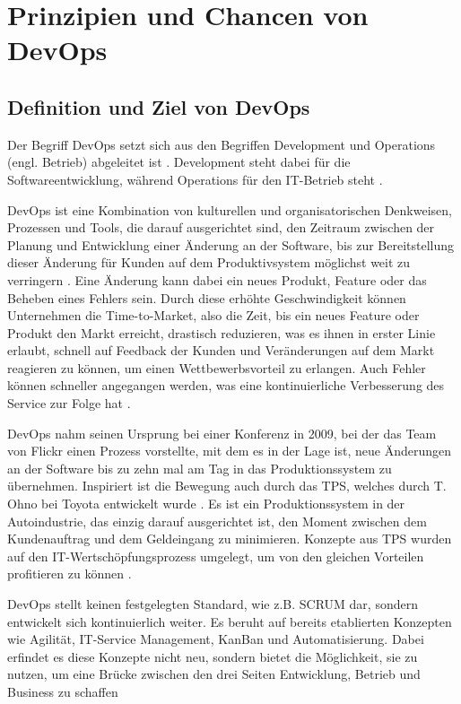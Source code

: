 \newpage
\section{Prinzipien und Chancen von DevOps}

\subsection{Definition und Ziel von DevOps}

Der Begriff DevOps setzt sich aus den Begriffen Development und 
Operations (engl. Betrieb) abgeleitet ist \cite{Alt2017}.
Development steht dabei für die Softwareentwicklung,
während Operations für den IT-Betrieb steht \cite{DevOpsAgileHeroes}.

DevOps ist eine Kombination von kulturellen und organisatorischen Denkweisen,
Prozessen und Tools, die darauf ausgerichtet sind, den Zeitraum zwischen 
der Planung und Entwicklung einer Änderung an der Software,
bis zur Bereitstellung dieser
Änderung für Kunden auf dem Produktivsystem möglichst weit zu verringern \cite{AmazonDevOps}.
Eine Änderung kann dabei ein neues Produkt, Feature oder das Beheben eines Fehlers sein.
Durch diese erhöhte Geschwindigkeit können Unternehmen die Time-to-Market,
also die Zeit, bis ein neues Feature oder Produkt den Markt erreicht,
drastisch reduzieren, was es ihnen in erster Linie erlaubt,
schnell auf Feedback der Kunden und Veränderungen auf dem Markt reagieren zu können,
um einen Wettbewerbsvorteil zu erlangen. Auch Fehler können schneller angegangen werden,
was eine kontinuierliche Verbesserung des Service zur Folge hat \cite{Halstenberg2020}.

DevOps nahm seinen Ursprung bei einer Konferenz in 2009, bei der das Team von Flickr
einen Prozess vorstellte, mit dem es in der Lage ist, neue Änderungen an der Software
bis zu zehn mal am Tag in das Produktionssystem zu übernehmen.
Inspiriert ist die Bewegung auch durch das \ac{TPS}, welches durch
T. Ohno bei Toyota entwickelt wurde \cite{Halstenberg2020}.
Es ist ein Produktionssystem in der Autoindustrie, das einzig darauf ausgerichtet ist,
den Moment zwischen dem Kundenauftrag und dem Geldeingang zu minimieren.
Konzepte aus \ac{TPS} wurden auf den IT-Wertschöpfungsprozess umgelegt,
um von den gleichen Vorteilen profitieren zu können \cite{Halstenberg2020}.

DevOps stellt keinen festgelegten Standard, wie z.B. SCRUM dar,
sondern entwickelt sich kontinuierlich weiter.
Es beruht auf bereits etablierten Konzepten wie Agilität, IT-Service Management,
KanBan und Automatisierung. Dabei erfindet es diese Konzepte nicht neu, sondern bietet
die Möglichkeit, sie zu nutzen, um eine Brücke zwischen den drei Seiten 
Entwicklung, Betrieb und Business zu schaffen \cite{Halstenberg2020}

